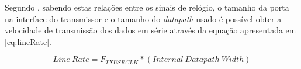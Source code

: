 
\begin{table}[h!]
		\caption[Relação das frequências dos sinais de relógio \textit{TXUSRCLK2} e \textit{TXUSRCLK}]{Relação das frequências dos sinais de relógio \textit{TXUSRCLK2} e \textit{TXUSRCLK} (adaptada de \cite{R011})}
	\label{table:freq_tx}
	\centering
\end{table}


Segundo \cite{R011}, sabendo estas relações entre os sinais de relógio, o tamanho da porta na interface do transmissor e o tamanho do \textit{datapath} usado é possível obter a velocidade de transmissão dos dados em série através da equação apresentada em \ref{eq:lineRate}.

\begin{equation} \label{eq:lineRate}
Line\ Rate = F_{TXUSRCLK}*(Internal\ Datapath\ Width)
\end{equation}


